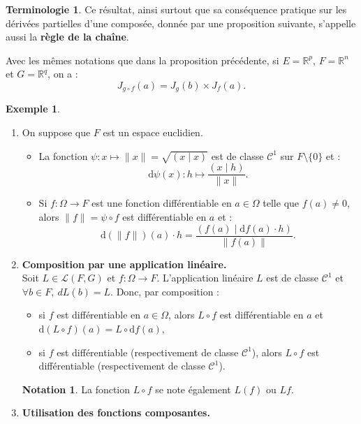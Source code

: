 \documentclass[french]{article}
\newcommand{\R}{\mathbb{R}}
\renewcommand{\d}{\text{d}}
\theoremstyle{plain}
\theoremstyle{definition}
\newtheorem*{ex}{Exemple}
\newtheorem*{notation}{Notation}
\newtheorem*{terminologie}{Terminologie}
\theoremstyle{remark}
\begin{document}
\begin{terminologie}
	Ce résultat, ainsi surtout que sa conséquence pratique sur les dérivées partielles d'une composée, donnée par une proposition suivante, s'appelle aussi la \textbf{règle de la chaîne}.
\end{terminologie}

\begin{prop}
	Avec les mêmes notations que dans la proposition précédente, si $E=\R^p$, $F=\R^n$ et $G=\R^q$, on a :
	$$J_{g\circ f}(a)=J_g(b)\times J_f(a).$$
\end{prop}

\begin{ex}
	\begin{enumerate}
		\item On suppose que $F$ est un espace euclidien. \\
		\begin{itemize}
			\item La fonction $\psi:x\mapsto\lVert x\rVert=\sqrt{(x\mid x)}$ est de classe $\mathcal{C}^1$ sur $F\setminus\{0\}$ et :
			$$\d\psi(x):h\mapsto\frac{(x\mid h)}{\lVert x\rVert}.$$
			\item Si $f:\Omega\to F$ est une fonction différentiable en $a\in\Omega$ telle que $f(a)\ne0$, alors $\lVert f\rVert=\psi\circ f$ est différentiable en $a$ et :
			$$\d (\lVert f\rVert)(a)\cdot h=\frac{(f(a)\mid\d f(a)\cdot h)}{\lVert f(a)\rVert}.$$
		\end{itemize}
		\item \textbf{Composition par une application linéaire.}\\
		Soit $L\in\mathcal{L}(F,G)$ et $f:\Omega\to F$. L'application linéaire $L$ est de classe $\mathcal{C}^1$ et $\forall b\in F,\ dL(b)=L$. Donc, par composition :
		\begin{itemize}
			\item si $f$ est différentiable en $a\in\Omega$, alors $L\circ f$ est différentiable en $a$ et $\d (L\circ f)(a)=L\circ\d f(a)$,
			\item si $f$ est différentiable (respectivement de classe $\mathcal{C}^1$), alors $L\circ f$ est différentiable (respectivement de classe $\mathcal{C}^1$).
		\end{itemize}
		\begin{notation}
			La fonction $L\circ f$ se note également $L(f)$ ou $Lf$.
		\end{notation}
		\item \textbf{Utilisation des fonctions composantes.}\\

\end{enumerate}
\end{ex}
\end{document}
